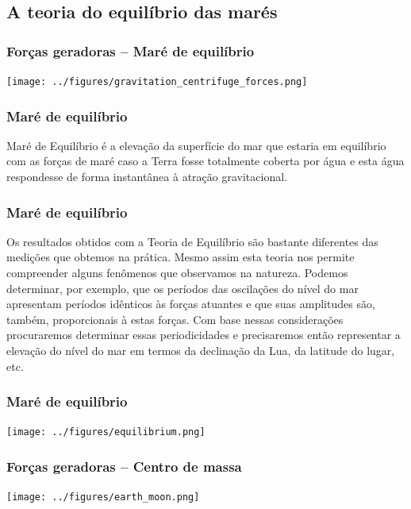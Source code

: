 \subsection{A teoria do equilíbrio das marés}
\begin{frame}
  \frametitle{Forças geradoras -- Maré de equilíbrio}
  \begin{center}
    \texttt{[image: ../figures/gravitation\_centrifuge\_forces.png]}
  \end{center}
\end{frame}

\begin{frame}
  \frametitle{Maré de equilíbrio}
  \begin{block}{}
  Maré de Equilíbrio é a elevação da superfície do mar que estaria em
  equilíbrio com as forças de maré caso a Terra fosse totalmente coberta por
  água e esta água respondesse de forma instantânea à atração gravitacional.
  \end{block}
\end{frame}


\begin{frame}
  \frametitle{Maré de equilíbrio}
  \small{
  \begin{block}{}
  Os resultados obtidos com a Teoria de Equilíbrio são bastante diferentes das
  medições que obtemos na prática. Mesmo assim esta teoria nos permite
  compreender alguns fenômenos que observamos na natureza. Podemos
  determinar, por exemplo, que os períodos das oscilações do nível do mar
  apresentam períodos idênticos às forças atuantes e que suas amplitudes são,
  também, proporcionais à estas forças. Com base nessas considerações
  procuraremos determinar essas periodicidades e precisaremos então
  representar a elevação do nível do mar em termos da declinação da Lua, da
  latitude do lugar, etc.
  \end{block}
  }
\end{frame}

\begin{frame}
  \frametitle{Maré de equilíbrio}
    \texttt{[image: ../figures/equilibrium.png]}
\end{frame}

\begin{frame}
  \frametitle{Forças geradoras -- Centro de massa}
  \begin{center}
    \texttt{[image: ../figures/earth\_moon.png]}
  \end{center}
\end{frame}



